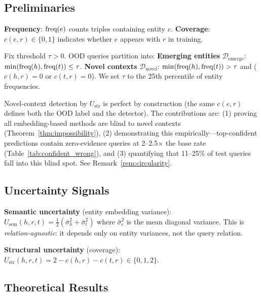 
\subsection{Preliminaries}

\textbf{Frequency}: $\text{freq}(e)$ counts triples containing entity $e$.
\textbf{Coverage}: $c(e,r) \in \{0,1\}$ indicates whether $e$ appears with $r$ in training.

\begin{definition}
\label{def:ood}
Fix threshold $\tau > 0$. OOD queries partition into:
\textbf{Emerging entities} $\mathcal{D}_{\text{emerge}}$: $\min(\text{freq}(h), \text{freq}(t)) \leq \tau$.
\textbf{Novel contexts} $\mathcal{D}_{\text{novel}}$: $\min(\text{freq}(h), \text{freq}(t)) > \tau$ and ($c(h,r)=0$ or $c(t,r)=0$).
We set $\tau$ to the 25th percentile of entity frequencies.
\end{definition}

Novel-context detection by $U_{\text{str}}$ is perfect by construction (the same $c(e,r)$ defines both the OOD label and the detector). The contributions are: (1) proving all embedding-based methods are blind to novel contexts (Theorem~\ref{thm:impossibility}), (2) demonstrating this empirically---top-confident predictions contain zero-evidence queries at 2--2.5$\times$ the base rate (Table~\ref{tab:confident_wrong}), and (3) quantifying that 11--25\% of test queries fall into this blind spot. See Remark~\ref{rem:circularity}.

\subsection{Uncertainty Signals}

\textbf{Semantic uncertainty} (entity embedding variance): $U_{\text{sem}}(h,r,t) = \frac{1}{2}(\bar{\sigma}^2_h + \bar{\sigma}^2_t)$ where $\bar{\sigma}^2_e$ is the mean diagonal variance. This is \emph{relation-agnostic}: it depends only on entity variances, not the query relation.

\textbf{Structural uncertainty} (coverage): $U_{\text{str}}(h,r,t) = 2 - c(h,r) - c(t,r) \in \{0, 1, 2\}$.

\subsection{Theoretical Results}

